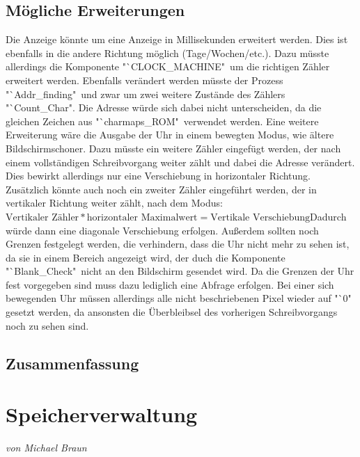 \documentclass[12pt,a4paper,bibliography=totoc,listof=totoc]{scrartcl}
\begin{document}
\subsection{Mögliche Erweiterungen}
Die Anzeige könnte um eine Anzeige in Millisekunden erweitert werden. Dies ist ebenfalls in die andere Richtung möglich (Tage/Wochen/etc.). 
Dazu müsste allerdings die Komponente "`CLOCK\_MACHINE"\, um die richtigen Zähler erweitert werden. Ebenfalls verändert werden müsste der Prozess 
"`Addr\_finding"\, und zwar um zwei weitere Zustände des Zählers "`Count\_Char". Die Adresse würde sich dabei nicht unterscheiden, da die gleichen 
Zeichen aus "`charmaps\_ROM" \,verwendet werden.\newline
Eine weitere Erweiterung wäre die Ausgabe der Uhr in einem bewegten Modus, wie ältere Bildschirmschoner. Dazu müsste ein weitere Zähler eingefügt 
werden, der nach einem vollständigen Schreibvorgang weiter zählt und dabei die Adresse verändert. Dies bewirkt allerdings nur eine Verschiebung in 
horizontaler Richtung. Zusätzlich könnte auch noch ein zweiter Zähler eingeführt werden, der in vertikaler Richtung weiter zählt, nach dem 
Modus: \newline $\text{Vertikaler Zähler} * \text{horizontaler Maximalwert} = \text{Vertikale Verschiebung}$\newline Dadurch würde dann eine diagonale Verschiebung erfolgen. Außerdem sollten noch Grenzen festgelegt 
werden, die verhindern, dass die Uhr nicht mehr zu sehen ist, da sie in einem Bereich angezeigt wird, der duch die Komponente "`Blank\_Check"\, nicht an 
den Bildschirm gesendet wird. Da die Grenzen der Uhr fest vorgegeben sind muss dazu lediglich eine Abfrage erfolgen.
Bei einer sich bewegenden Uhr müssen allerdings alle nicht beschriebenen Pixel wieder auf "`0" \,gesetzt werden, da ansonsten die Überbleibsel des 
vorherigen Schreibvorgangs noch zu sehen sind.

\subsection{Zusammenfassung}

\pagebreak
\section{Speicherverwaltung}
\textit{von Michael Braun}
\end{document}
